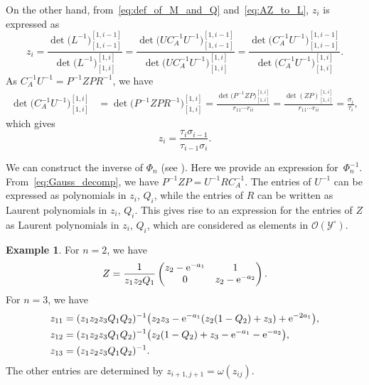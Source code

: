 \documentclass[10pt,a4paper]{amsart}
\numberwithin{equation}{section}
\theoremstyle{definition}
\newtheorem{Example}[Theorem]{Example}
\begin{document}
On the other hand, from~\eqref{eq:def_of_M_and_Q} and~\eqref{eq:AZ_to_L}, $z_i$ is expressed as
\[
z_{i}
=\frac{\det\bigl(L^{-1}\bigr)^{[1,i-1]}_{[1,i-1]}}{\det\bigl(L^{-1}\bigr)^{[1,i]}_{[1,i]}}
=\frac{\det\bigl(UC_A^{-1}U^{-1}\bigr)^{[1,i-1]}_{[1,i-1]}}{\det\bigl(UC_A^{-1}U^{-1}\bigr)^{[1,i]}_{[1,i]}}
=
\frac{\det\bigl(C_A^{-1}U^{-1}\bigr)^{[1,i-1]}_{[1,i-1]}}{\det\bigl(C_A^{-1}U^{-1}\bigr)^{[1,i]}_{[1,i]}}.
\]
As $C_A^{-1}U^{-1}
=P^{-1}ZPR^{-1}$, we have
\begin{align*}
\det\bigl(C_A^{-1}U^{-1}\bigr)^{[1,i]}_{[1,i]}
&
=\det\bigl(P^{-1}ZPR^{-1}\bigr)^{[1,i]}_{[1,i]}
=\frac{\det\bigl(P^{-1}ZP\bigr)^{[1,i]}_{[1,i]}}{r_{11}\cdots r_{ii}}
=\frac{\det(ZP)^{[1,i]}_{[1,i]}}{r_{11}\cdots r_{ii}}
=\frac{\sigma_i}{\tau_i},
\end{align*}
which gives
\begin{equation}\label{eq:z_to_tau}
z_i
=\frac{\tau_i\sigma_{i-1}}{\tau_{i-1}\sigma_i}.
\end{equation}


We can construct the inverse of
$\Phi_n$ (see \cite[Section~3.4]{IIM}).
Here we provide an expression for~$\Phi_n^{-1}$.
From~\eqref{eq:Gauss_decomp}, we have
$
P^{-1}ZP=U^{-1}R C_A^{-1}$.
The entries of $U^{-1}$ can be expressed as
polynomials in $z_i$, $Q_i$, while the entries of $R$ can be written as Laurent polynomials in $z_i$, $Q_i$.
This gives rise to an expression
for the entries of $Z$ as Laurent polynomials in $z_i$, $Q_i$, which are considered as elements in $\mathscr{O}(\mathscr{Y}^\circ)$.
\begin{Example} For $n=2$, we have
\[%
Z=
\frac{1}{z_1z_2Q_1}
\begin{pmatrix}
z_2-{\rm e}^{-a_1}&1\\
0&z_2-{\rm e}^{-a_2}
\end{pmatrix}.
\]
For $n=3$, we have
\begin{align*}
&z_{11}=(z_1z_2z_3Q_1Q_2)^{-1}\bigl(z_2z_3-{\rm e}^{-a_1}(z_2(1-Q_2)+z_3)+{\rm e}^{-2a_1}\bigr),\\
&z_{12}=(z_1z_2z_3Q_1Q_2)^{-1}\bigl(z_2(1-Q_2)+z_3-{\rm e}^{-a_1}-{\rm e}^{-a_2}\bigr),\\
&z_{13}=(z_1z_2z_3Q_1Q_2)^{-1}.
\end{align*}
The other entries are determined by
$z_{i+1,j+1}=\omega(z_{ij})$.
\end{Example}
\end{document}
